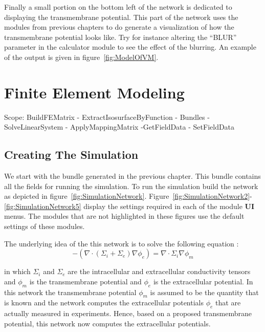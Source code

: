 \documentclass[fleqn,11pt,openany]{book}
\begin{document}
Finally a small portion on the bottom left of the network is dedicated to displaying the transmembrane potential. This part of the network uses the modules from previous chapters to do generate a visualization of how the transmembrane potential looks like. Try for instance altering the \enquote{BLUR} parameter in the calculator module to see the effect of the blurring. An example of the output is given in figure~\ref{fig:ModelOfVM}.


\chapter{Finite Element Modeling}

\begin{introduction}
Scope: BuildFEMatrix - ExtractIsosurfaceByFunction - Bundles - SolveLinearSystem - ApplyMappingMatrix -GetFieldData - SetFieldData
\end{introduction}

\section{Creating The Simulation}

We start with the bundle generated in the previous chapter. This bundle contains all the fields for running the simulation. To run the simulation build the network as depicted in figure~\ref{fig:SimulationNetwork}. Figure~\ref{fig:SimulationNetwork2}-\ref{fig:SimulationNetwork5} display the settings required in each of the module {\bf UI} menus. The modules that are not highlighted in these figures use the default settings of these modules.

The underlying idea of the this network is to solve the following equation :
\begin{equation}\label{eqn:bidomain}
	-(\nabla \cdot (\Sigma_i + \Sigma_e ) \nabla \phi_e) = \nabla \cdot \Sigma_i \nabla \phi_m
\end{equation}

\noindent in which $\Sigma_i$ and $\Sigma_e$ are the intracellular and extracellular conductivity tensors and $\phi_m$ is the transmembrane potential and $\phi_e$ is the extracellular potential. In this network the transmembrane potential $\phi_m$ is assumed to be the quantity that is known and the network computes the extracellular potentials $\phi_e$  that are actually measured in experiments. Hence, based on a proposed transmembrane potential, this network now computes the extracellular potentials.
\end{document}
